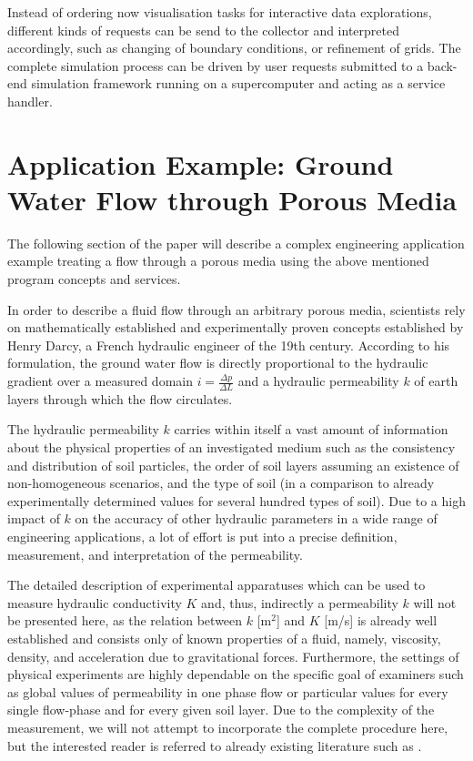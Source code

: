 \documentclass[10pt, conference]{IEEEtran}
\begin{document}
Instead of ordering now visualisation tasks for interactive data explorations, different kinds of requests can be send to the collector and interpreted accordingly, such as changing of boundary
conditions, or refinement of grids. The complete simulation process can be driven by user requests submitted to a back-end simulation framework running on a supercomputer and acting as a
service handler.


\section{Application Example: Ground Water Flow through Porous Media}

The following section of the paper will describe a complex engineering application example treating a flow through a porous media using the above mentioned program concepts and services.

In order to describe a fluid flow through an arbitrary porous media, scientists rely on mathematically established and experimentally proven concepts established by Henry Darcy, a French
hydraulic engineer of the 19th century. According to his formulation, the ground water flow is directly proportional to the hydraulic gradient over a measured domain $i=\frac{\Delta p}{\Delta L}$
and a hydraulic permeability $k$ of earth layers through which the flow circulates. 

The hydraulic permeability $k$ carries within itself a vast amount of information about the physical properties of an investigated medium such as the consistency and distribution of soil particles,
the order of soil layers assuming an existence of non-homogeneous scenarios, and the type of soil (in a comparison to already experimentally determined values for several hundred types of
soil). Due to a high impact of $k$ on the accuracy of other hydraulic parameters in a wide range of engineering applications, a lot of effort is put into a precise definition, measurement, and
interpretation of the permeability.

The detailed description of experimental apparatuses which can be used to measure hydraulic conductivity $K$ and, thus, indirectly a permeability $k$ will not be presented here, as the relation
between $k$ [m$^{2}$] and $K$ [m/s] is already well established and consists only of known properties of a fluid, namely, viscosity, density, and acceleration due to gravitational forces.
Furthermore, the settings of physical experiments are highly dependable on the specific goal of examiners such as global values of permeability in one phase flow or particular values for every
single flow-phase and for every given soil layer. Due to the complexity of the measurement, we will not attempt to incorporate the complete procedure here, but the interested reader is referred to
already existing literature such as \cite{Method9100}.
\end{document}
